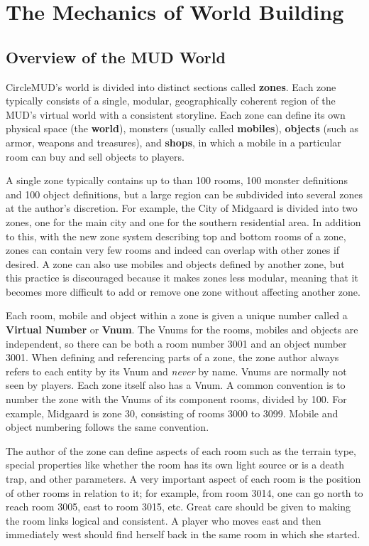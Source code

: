 \documentclass[11pt]{article}
\begin{document}
\section{The Mechanics of World Building}
\subsection{Overview of the MUD World}
CircleMUD's world is divided into distinct sections called {\bf zones}. Each zone typically consists of a single, modular, geographically coherent region of the MUD's virtual world with a consistent storyline.  Each zone can define its own physical space (the {\bf world}), monsters (usually called {\bf mobiles}), {\bf objects} (such as armor, weapons and treasures), and {\bf shops}, in which a mobile in a particular room can buy and sell objects to players.
\par
A single zone typically contains up to than 100 rooms, 100 monster definitions and 100 object definitions, but a large region can be subdivided into several zones at the author's discretion.  For example, the City of Midgaard is divided into two zones, one for the main city and one for the southern residential area.  In addition to this, with the new zone system describing top and bottom rooms of a zone, zones can contain very few rooms and indeed can overlap with other zones if desired.  A zone can also use mobiles and objects defined by another zone, but this practice is discouraged because it makes zones less modular, meaning that it becomes more difficult to add or remove one zone without affecting another zone. 
\par
Each room, mobile and object within a zone is given a unique number called a {\bf Virtual Number} or {\bf Vnum}. The Vnums for the rooms, mobiles and objects are independent, so there can be both a room number 3001 and an object number 3001.  When defining and referencing parts of a zone, the zone author always refers to each entity by its Vnum and {\em never} by name.  Vnums are normally not seen by players.  Each zone itself also has a Vnum.  A common convention is to number the zone with the Vnums of its component rooms, divided by 100.  For example, Midgaard is zone 30, consisting of rooms 3000 to 3099.  Mobile and object numbering follows the same convention. 
\par
The author of the zone can define aspects of each room such as the terrain type, special properties like whether the room has its own light source or is a death trap, and other parameters.  A very important aspect of each room is the position of other rooms in relation to it; for example, from room 3014, one can go north to reach room 3005, east to room 3015, etc. Great care should be given to making the room links logical and consistent. A player who moves east and then immediately west should find herself back in the same room in which she started. 
\end{document}
